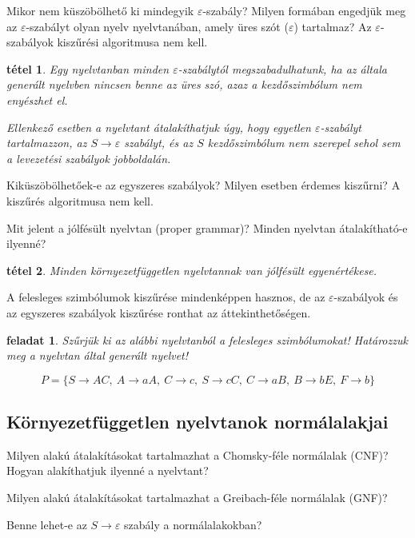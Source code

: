 \documentclass[a4paper]{article}
\newtheorem{feladat}{feladat}[section]
\newtheorem{tetel}{tétel}[section]
\begin{document}
Mikor nem  küszöbölhető ki mindegyik $\varepsilon$-szabály?
Milyen formában engedjük meg az $\varepsilon$-szabályt olyan nyelv nyelvtanában,
amely üres szót ($\varepsilon$) tartalmaz?
Az $\varepsilon$-szabályok kiszűrési algoritmusa nem kell.

\begin{tetel}
Egy nyelvtanban minden $\varepsilon$-szabálytól megszabadulhatunk, ha az
általa generált nyelvben nincsen benne az üres szó, azaz a kezdőszimbólum
nem enyészhet el.

Ellenkező esetben a nyelvtant átalakíthatjuk úgy, hogy egyetlen
$\varepsilon$-szabályt tartalmazzon, az $S \rightarrow \varepsilon$ szabályt,
és az $S$ kezdőszimbólum nem szerepel sehol sem a levezetési szabályok
jobboldalán.
\end{tetel}

Kiküszöbölhetőek-e az egyszeres szabályok? Milyen esetben érdemes
kiszűrni? A kiszűrés algoritmusa nem kell.

Mit jelent a jólfésült nyelvtan (proper grammar)? Minden nyelvtan
átalakítható-e ilyenné?

\begin{tetel}
Minden környezetfüggetlen nyelvtannak van jólfésült egyenértékese.
\end{tetel}

A felesleges szimbólumok kiszűrése mindenképpen hasznos, de az
$\varepsilon$-szabályok és az egyszeres szabályok kiszűrése ronthat az
áttekinthetőségen.

\begin{feladat}
    Szűrjük ki az alábbi nyelvtanból a felesleges szimbólumokat!
    Határozzuk meg a nyelvtan által generált nyelvet!

\[P=\{ S \to AC,\: A\to aA ,\: C\to c,\: S\to cC,\: C\to aB,\: B\to
bE,\: F\to b\}\]
\end{feladat}

\subsection{Környezetfüggetlen nyelvtanok normálalakjai}

Milyen alakú átalakításokat tartalmazhat a Chomsky-féle normálalak
(CNF)?
Hogyan alakíthatjuk ilyenné a nyelvtant?

Milyen alakú átalakításokat tartalmazhat a Greibach-féle normálalak
(GNF)?

Benne lehet-e az $S\rightarrow \varepsilon$ szabály a normálalakokban?
\end{document}

